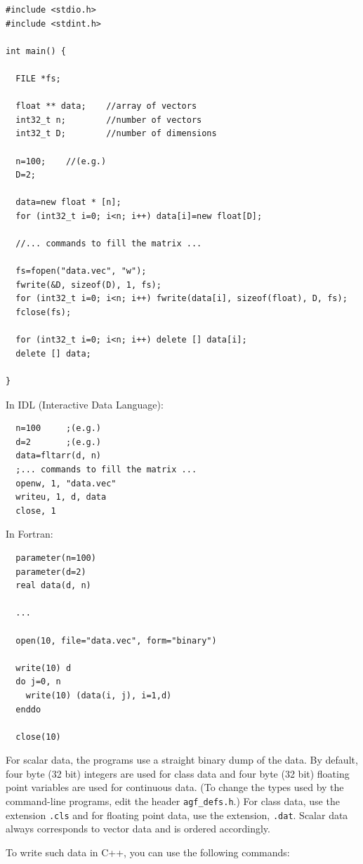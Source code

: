 \documentclass[12pt]{article}
\begin{document}
\begin{verbatim}
#include <stdio.h>
#include <stdint.h>

int main() {

  FILE *fs;

  float ** data;	//array of vectors
  int32_t n;		//number of vectors
  int32_t D;		//number of dimensions

  n=100;	//(e.g.)
  D=2;

  data=new float * [n];
  for (int32_t i=0; i<n; i++) data[i]=new float[D];

  //... commands to fill the matrix ...

  fs=fopen("data.vec", "w");
  fwrite(&D, sizeof(D), 1, fs);
  for (int32_t i=0; i<n; i++) fwrite(data[i], sizeof(float), D, fs);
  fclose(fs);
  
  for (int32_t i=0; i<n; i++) delete [] data[i];
  delete [] data;

}
\end{verbatim}

In IDL (Interactive Data Language):

\begin{verbatim}
  n=100		;(e.g.)
  d=2		;(e.g.)
  data=fltarr(d, n)
  ;... commands to fill the matrix ...
  openw, 1, "data.vec"
  writeu, 1, d, data
  close, 1
\end{verbatim}

In Fortran:

\begin{verbatim}
  parameter(n=100)
  parameter(d=2)
  real data(d, n)

  ...

  open(10, file="data.vec", form="binary")
 
  write(10) d
  do j=0, n
    write(10) (data(i, j), i=1,d)
  enddo

  close(10)
\end{verbatim}

For scalar data, the programs use a straight binary dump of the data.  By default, four byte (32 bit) integers are used for class data and four byte (32 bit) floating point variables are used for continuous data. (To change the types used by the command-line programs, edit the header \verb/agf_defs.h/.) For class data, use the extension \verb".cls" and for floating point data, use the extension, \verb".dat".  Scalar data always corresponds to vector data and is ordered accordingly.


To write such data in C++, you can use the following commands:
\end{document}
